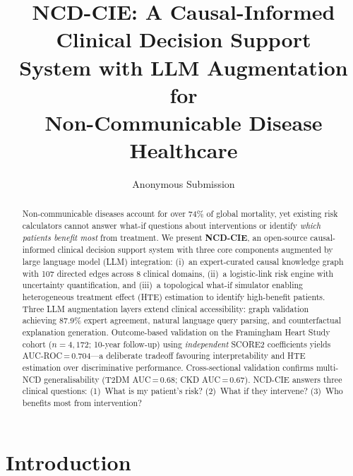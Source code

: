 \documentclass[runningheads]{llncs}
\begin{document}
\title{NCD-CIE: A Causal-Informed Clinical Decision Support\\System with LLM Augmentation for\\Non-Communicable Disease Healthcare}

\author{Anonymous Submission}

\maketitle

\begin{abstract}
Non-communicable diseases account for over 74\% of global mortality,
yet existing risk calculators cannot answer what-if questions about
interventions or identify \emph{which patients benefit most} from
treatment.
We present \textbf{NCD-CIE}, an open-source causal-informed clinical
decision support system with three core components augmented by large
language model (LLM) integration:
(i)~an expert-curated causal knowledge graph with 107 directed edges
across 8 clinical domains,
(ii)~a logistic-link risk engine with uncertainty quantification, and
(iii)~a topological what-if simulator enabling heterogeneous treatment
effect (HTE) estimation to identify high-benefit patients.
Three LLM augmentation layers extend clinical accessibility:
graph validation achieving 87.9\% expert agreement,
natural language query parsing, and
counterfactual explanation generation.
Outcome-based validation on the Framingham Heart Study cohort
($n\!=\!4{,}172$; 10-year follow-up) using \emph{independent} SCORE2
coefficients yields AUC-ROC\,=\,0.704---a deliberate tradeoff
favouring interpretability and HTE estimation over discriminative
performance.
Cross-sectional validation confirms multi-NCD generalisability
(T2DM AUC\,=\,0.68; CKD AUC\,=\,0.67).
NCD-CIE answers three clinical questions: (1)~What is my patient's
risk? (2)~What if they intervene? (3)~Who benefits most from
intervention?

\end{abstract}

\section{Introduction}\label{sec:intro}
\end{document}
